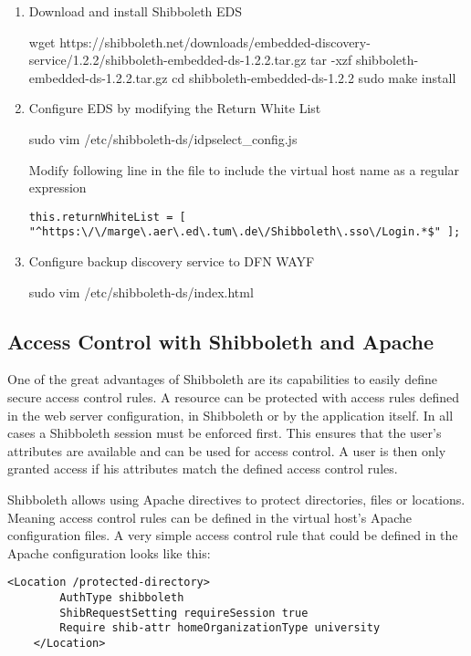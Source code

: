 \begin{enumerate}
    \item Download and install Shibboleth EDS
    \begin{terminal}
        wget https://shibboleth.net/downloads/embedded-discovery-service/1.2.2/shibboleth-embedded-ds-1.2.2.tar.gz
        tar -xzf shibboleth-embedded-ds-1.2.2.tar.gz
        cd shibboleth-embedded-ds-1.2.2
        sudo make install
    \end{terminal}
    \item  Configure EDS by modifying the Return White List
    \begin{terminal}
        sudo vim /etc/shibboleth-ds/idpselect_config.js
    \end{terminal}
    Modify following line in the file to include the virtual host name as a
    regular expression
    \begin{lstlisting}[frame={l}]
        this.returnWhiteList = [ "^https:\/\/marge\.aer\.ed\.tum\.de\/Shibboleth\.sso\/Login.*$" ];
    \end{lstlisting}
    \item Configure backup discovery service to DFN WAYF
    \begin{terminal}
        sudo vim /etc/shibboleth-ds/index.html
    \end{terminal}
\end{enumerate}

\subsection{Access Control with Shibboleth and Apache}
One of the great advantages of Shibboleth are its capabilities to easily define
secure access control rules. A resource can be protected with access rules
defined in the web server configuration, in Shibboleth or by the application
itself. In all cases a Shibboleth session must be enforced first. This ensures
that the user's attributes are available and can be used for access control. A
user is then only granted access if his attributes match the defined access
control rules. 

Shibboleth allows using Apache directives to protect directories, files or
locations. Meaning access control rules can be defined in the virtual host's
Apache configuration files. A very simple access control rule that could be
defined in the Apache configuration looks like this: 

\begin{lstlisting}[frame=single]
    <Location /protected-directory>
        AuthType shibboleth
        ShibRequestSetting requireSession true
        Require shib-attr homeOrganizationType university
    </Location>
\end{lstlisting}

